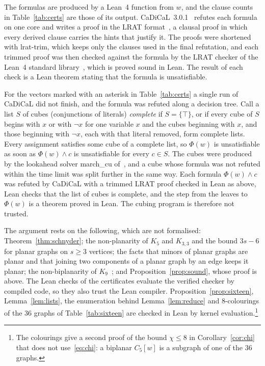\documentclass[11pt]{amsart}
\theoremstyle{definition}
\theoremstyle{remark}
\numberwithin{equation}{section}
\newcommand{\cw}{C_5[w]}
\begin{document}
The formulas are produced by a Lean~4 function from $w$, and the clause counts in Table~\ref{tab:certs} are those of its output. CaDiCaL~3.0.1~\cite{CaD} refutes each formula on one core and writes a proof in the LRAT format~\cite{LRAT}, a clausal proof in which every derived clause carries the hints that justify it. The proofs were shortened with lrat-trim, which keeps only the clauses used in the final refutation, and each trimmed proof was then checked against the formula by the LRAT checker of the Lean~4 standard library~\cite{Le}, which is proved sound in Lean. The result of each check is a Lean theorem stating that the formula is unsatisfiable.

For the vectors marked with an asterisk in Table~\ref{tab:certs} a single run of CaDiCaL did not finish, and the formula was refuted along a decision tree. Call a list $S$ of cubes (conjunctions of literals) \emph{complete} if $S=\{\top\}$, or if every cube of $S$ begins with $x$ or with $\neg x$ for one variable $x$ and the cubes beginning with $x$, and those beginning with $\neg x$, each with that literal removed, form complete lists. Every assignment satisfies some cube of a complete list, so $\Phi(w)$ is unsatisfiable as soon as $\Phi(w)\wedge c$ is unsatisfiable for every $c\in S$. The cubes were produced by the lookahead solver march\_cu of~\cite{HKWB}, and a cube whose formula was not refuted within the time limit was split further in the same way. Each formula $\Phi(w)\wedge c$ was refuted by CaDiCaL with a trimmed LRAT proof checked in Lean as above, Lean checks that the list of cubes is complete, and the step from the leaves to $\Phi(w)$ is a theorem proved in Lean. The cubing program is therefore not trusted.

\begin{table}[ht]
\centering\small
\caption{The $26$ weight vectors with $n(w)=17$ and $s(w)\le8$, up to the dihedral action, with the size of $\Phi(w)$, the solving time of CaDiCaL, the size of the trimmed LRAT proof and the time of the Lean check.}\label{tab:certs}
\end{table}

The argument rests on the following, which are not formalised: Theorem~\ref{thm:schnyder}; the non-planarity of $K_5$ and $K_{3,3}$ and the bound $3s-6$ for planar graphs on $s\ge3$ vertices; the facts that minors of planar graphs are planar and that joining two components of a planar graph by an edge keeps it planar; the non-biplanarity of $K_9$~\cite{BHK,Tu}; and Proposition~\ref{prop:sound}, whose proof is above. The Lean checks of the certificates evaluate the verified checker by compiled code, so they also trust the Lean compiler. Proposition~\ref{prop:sixteen}, Lemma~\ref{lem:lists}, the enumeration behind Lemma~\ref{lem:reduce} and $8$-colourings of the $36$ graphs of Table~\ref{tab:sixteen} are checked in Lean by kernel evaluation.\footnote{The colourings give a second proof of the bound $\chi\le8$ in Corollary~\ref{cor:chi} that does not use~\eqref{eq:chi}: a biplanar $\cw$ is a subgraph of one of the $36$ graphs.}
\end{document}

